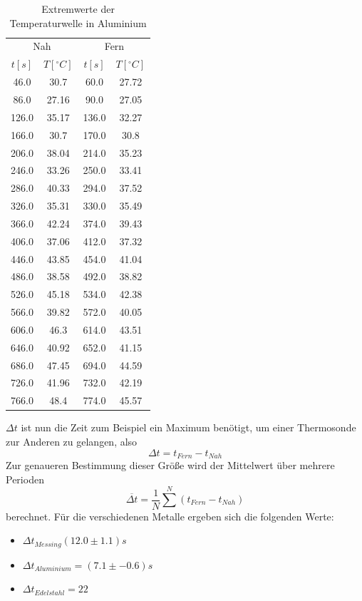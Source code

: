 \documentclass[11pt]{article}
\begin{document}
\begin{table}[P]
\centering
\label{alu_extr}
\begin{tabular}{c|c||c|c}
\multicolumn{2}{c||}{Nah} & \multicolumn{2}{c}{Fern}\\
$t[s]$ & $T[^\circ C]$ & $t[s]$ & $T[^\circ C]$ \\
\hline
46.0 & 30.7 & 60.0 & 27.72\\
86.0 & 27.16 & 90.0 & 27.05\\
126.0 & 35.17 & 136.0 & 32.27\\
166.0 & 30.7 & 170.0 & 30.8\\
206.0 & 38.04 & 214.0 & 35.23\\
246.0 & 33.26 & 250.0 & 33.41\\
286.0 & 40.33 & 294.0 & 37.52\\
326.0 & 35.31 & 330.0 & 35.49\\
366.0 & 42.24 & 374.0 & 39.43\\
406.0 & 37.06 & 412.0 & 37.32\\
446.0 & 43.85 & 454.0 & 41.04\\
486.0 & 38.58 & 492.0 & 38.82\\
526.0 & 45.18 & 534.0 & 42.38\\
566.0 & 39.82 & 572.0 & 40.05\\
606.0 & 46.3 & 614.0 & 43.51\\
646.0 & 40.92 & 652.0 & 41.15\\
686.0 & 47.45 & 694.0 & 44.59\\
726.0 & 41.96 & 732.0 & 42.19\\
766.0 & 48.4 & 774.0 & 45.57\\

\end{tabular}
\caption{Extremwerte der Temperaturwelle in Aluminium}
\end{table}
 $\Delta t$ ist nun die Zeit zum Beispiel ein Maximum benötigt, um einer Thermosonde zur Anderen zu gelangen, also
\begin{equation}
\Delta t = t_{Fern} - t_{Nah}
\end{equation}
Zur genaueren Bestimmung dieser Größe wird der Mittelwert über mehrere Perioden 
\begin{equation}
\overline{\Delta t} = \frac1N \sum^N (t_{Fern}-t_{Nah})
\end{equation}
berechnet. Für die verschiedenen Metalle ergeben sich die folgenden Werte:
\begin{itemize}
\item$\Delta t_{Messing} (12.0\pm1.1)s$
\item $\Delta t_{Aluminium} = (7.1\pm-0.6)s$
\item $\Delta t_{Edelstahl} =  22$
\end{itemize}
\end{document}
